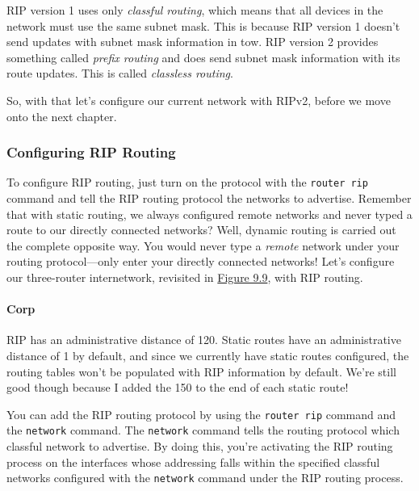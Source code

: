 RIP version 1 uses only \emph{classful routing}, which means that all
devices in the network must use the same subnet mask. This is because
RIP version 1 doesn't send updates with subnet mask information in tow.
RIP version 2 provides something called \emph{prefix routing} and does
send subnet mask information with its route updates. This is called
\emph{classless routing}.

So, with that let's configure our current network with RIPv2, before we
move onto the next chapter.

\subsubsection[Configuring RIP
Routing]{\texorpdfstring{\protect\hypertarget{c09.xhtmlux5cux23c09-sec-15}{}{}Configuring
RIP Routing}{Configuring RIP Routing}}

To configure RIP routing, just turn on the protocol with the
\texttt{router\ rip} command and tell the RIP routing protocol the
networks to advertise. Remember that with static routing, we always
configured remote networks and never typed a route to our directly
connected networks? Well, dynamic routing is carried out the complete
opposite way. You would never type a \emph{remote} network under your
routing protocol---only enter your directly connected networks! Let's
configure our three-router internetwork, revisited in
\protect\hyperlink{c09.xhtmlux5cux23figure9-9}{Figure 9.9}, with RIP
routing.

\paragraph{Corp}

RIP has an administrative distance of 120. Static routes have an
administrative distance of 1 by default, and since we currently have
static routes configured, the routing tables won't be populated with RIP
information by default. We're still good though because I added the 150
to the end of each static route!

You can add the RIP routing protocol by using the \texttt{router\ rip}
command and the \texttt{net}\texttt{work} command. The \texttt{network}
command tells the routing protocol which classful network to advertise.
By doing this, you're activating the RIP routing process on the
interfaces whose addressing falls within the specified classful networks
configured with the \texttt{network} command under the RIP routing
process.

